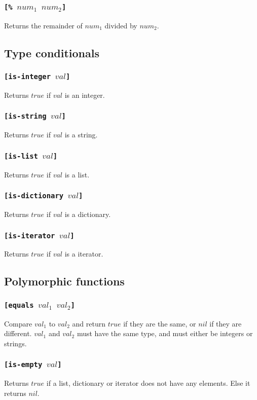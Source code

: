 \subsubsection{\tt{[\% }$num_1$ $num_2$\tt{]}}
Returns the remainder of $num_1$ divided by $num_2$.

\subsection{Type conditionals}
\subsubsection{\tt{[is-integer }$val$\tt{]}}
Returns $true$ if $val$ is an integer.
\subsubsection{\tt{[is-string }$val$\tt{]}}
Returns $true$ if $val$ is a string.
\subsubsection{\tt{[is-list }$val$\tt{]}}
Returns $true$ if $val$ is a list.
\subsubsection{\tt{[is-dictionary }$val$\tt{]}}
Returns $true$ if $val$ is a dictionary.
\subsubsection{\tt{[is-iterator }$val$\tt{]}}
Returns $true$ if $val$ is a iterator.

\subsection{Polymorphic functions}
\subsubsection{\tt{[equals }$val_1$ $val_2$\tt{]}}
Compare $val_1$ to $val_2$ and return $true$ if they are the same, or $nil$ if they are different. $val_1$ and $val_2$ must have the same type, and must either be integers or strings.
\subsubsection{\tt{[is-empty }$val$\tt{]}}
Returns $true$ if a list, dictionary or iterator does not have any elements. Else it returns $nil$.
